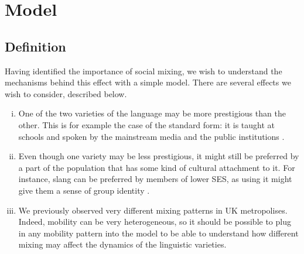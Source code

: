 \documentclass[../thesis.tex]{subfiles}
\begin{document}
\section{Model}

\subsection{Definition}
Having identified the importance of social mixing, we wish to understand the mechanisms
behind this effect with a simple model.
There are several effects we wish to consider, described below.
\begin{enumerate}[(i)]
  \item One of the two varieties of the language may be more prestigious than the other.
  This is for example the case of the standard form: it is taught at schools and spoken
  by the mainstream media and the public institutions \cite{DavilaInevitabilityStandard2016}.
  \item Even though one variety may be less prestigious, it might still be preferred by a
  part of the population that has some kind of cultural attachment to it. For instance,
  slang can be preferred by members of lower \ac{SES}, as using it might give them a
  sense of group identity \cite{LabovSocialStratification1966,TrudgillSocialDifferentiation1974}.
  \item We previously observed very different mixing patterns in UK metropolises.
  Indeed, mobility can be very heterogeneous, so it should be possible to plug in any
  mobility pattern into the model to be able to understand how different mixing may
  affect the dynamics of the linguistic varieties.
\end{enumerate}
\end{document}
